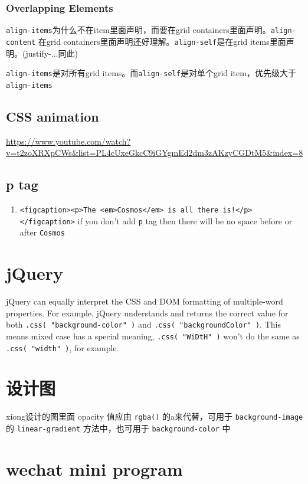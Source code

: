 \documentclass[a4paper, 12pt]{article}
\begin{document}
\subsubsection{Overlapping Elements}

\verb|align-items|为什么不在item里面声明，而要在grid containers里面声明。\verb|align-content| 在grid containers里面声明还好理解。\verb|align-self|是在grid items里面声明。(justify-...同此)

\verb|align-items|是对所有grid items。而\verb|align-self|是对单个grid item，优先级大于\verb|align-items|

\subsection{CSS animation}
\url{https://www.youtube.com/watch?v=t2zoXRXpCWs&list=PL4cUxeGkcC9iGYgmEd2dm3zAKzyCGDtM5&index=8}


\subsection{p tag}
\begin{enumerate}
\item \verb|<figcaption><p>The <em>Cosmos</em> is all there is!</p></figcaption>| if you don't add \verb|p| tag then there will be no space before or after \verb|Cosmos|
\end{enumerate}


\section{jQuery}
jQuery can equally interpret the CSS and DOM formatting of multiple-word properties. For example, jQuery understands and returns the correct value for both \verb|.css( "background-color" )| and \verb|.css( "backgroundColor" )|. This means mixed case has a special meaning, \verb|.css( "WiDtH" )| won't do the same as \verb|.css( "width" )|, for example.


\section{设计图}
xiong设计的图里面 opacity 值应由 \verb|rgba()| 的a来代替，可用于 \verb|background-image| 的 \verb|linear-gradient| 方法中，也可用于 \verb|background-color| 中


\section{wechat mini program}
\end{document}
